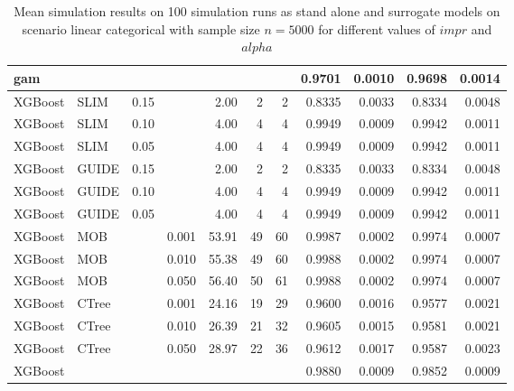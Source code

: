 \begin{table}[!htb]
\begin{tabular}[t]{l|l|r|r|r|r|r|r|r|r|r}
\hline
gam & & & & & & & 0.9701 & 0.0010 & 0.9698 & 0.0014\\
\hline

XGBoost & SLIM & 0.15 & & 2.00 & 2 & 2 & 0.8335 & 0.0033 & 0.8334 & 0.0048\\
XGBoost & SLIM & 0.10 & & 4.00 & 4 & 4 & 0.9949 & 0.0009 & 0.9942 & 0.0011\\
XGBoost & SLIM & 0.05 & & 4.00 & 4 & 4 & 0.9949 & 0.0009 & 0.9942 & 0.0011\\
XGBoost & GUIDE & 0.15 & & 2.00 & 2 & 2 & 0.8335 & 0.0033 & 0.8334 & 0.0048\\
XGBoost & GUIDE & 0.10 & & 4.00 & 4 & 4 & 0.9949 & 0.0009 & 0.9942 & 0.0011\\
XGBoost & GUIDE & 0.05 & & 4.00 & 4 & 4 & 0.9949 & 0.0009 & 0.9942 & 0.0011\\
XGBoost & MOB & & 0.001 & 53.91 & 49 & 60 & 0.9987 & 0.0002 & 0.9974 & 0.0007\\
XGBoost & MOB & & 0.010 & 55.38 & 49 & 60 & 0.9988 & 0.0002 & 0.9974 & 0.0007\\
XGBoost & MOB & & 0.050 & 56.40 & 50 & 61 & 0.9988 & 0.0002 & 0.9974 & 0.0007\\
XGBoost & CTree & & 0.001 & 24.16 & 19 & 29 & 0.9600 & 0.0016 & 0.9577 & 0.0021\\
XGBoost & CTree &  & 0.010 & 26.39 & 21 & 32 & 0.9605 & 0.0015 & 0.9581 & 0.0021\\
XGBoost & CTree & & 0.050 & 28.97 & 22 & 36 & 0.9612 & 0.0017 & 0.9587 & 0.0023\\
\hline
XGBoost & & & & & & & 0.9880 & 0.0009 & 0.9852 & 0.0009\\
\hline

\end{tabular}
\caption{Mean simulation results on 100 simulation runs as stand alone and surrogate models on scenario linear categorical with sample size $n = 5000$ for different values of $impr$ and $alpha$}
\label{tab:app_linear_abrupt_5000}

\end{table}




